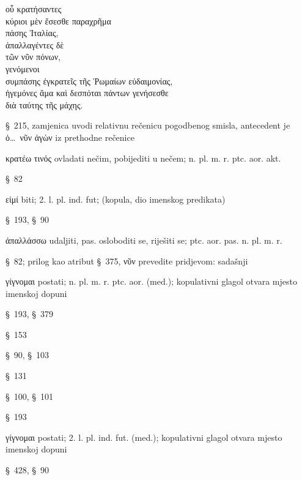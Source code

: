 
{\large
\begin{greek}
\noindent οὗ κρατήσαντες \\
κύριοι μὲν ἔσεσθε παραχρῆμα \\
\tabto{2em} πάσης Ἰταλίας, \\
ἀπαλλαγέντες δὲ \\
\tabto{2em} τῶν νῦν πόνων, \\
γενόμενοι \\
\tabto{2em} συμπάσης ἐγκρατεῖς τῆς Ῥωμαίων εὐδαιμονίας, \\
ἡγεμόνες ἅμα καὶ δεσπόται πάντων γενήσεσθε \\
\tabto{2em} διὰ ταύτης τῆς μάχης.\\

\end{greek}
}

\begin{description}[noitemsep]
\item[οὗ ] §~215, zamjenica uvodi relativnu rečenicu pogodbenog smisla, antecedent je ὁ\dots\ νῦν ἀγὼν iz prethodne rečenice
\item[κρατήσαντες ] κρατέω τινός ovladati nečim, pobijediti u nečem; n. pl. m. r. ptc. aor. akt.
\item[κύριοι ] §~82
\item[ἔσεσθε ] εἰμί biti; 2. l. pl. ind. fut; (kopula, dio imenskog predikata) 
\item[πάσης Ἰταλίας ] §~193, §~90
\item[ἀπαλλαγέντες ] ἀπαλλάσσω udaljiti, pas. osloboditi se, riješiti se; ptc. aor. pas. n. pl. m. r. 
\item[τῶν νῦν πόνων] §~82; prilog kao atribut §~375, νῦν prevedite pridjevom: sadašnji
\item[γενόμενοι ] γίγνομαι postati; n. pl. m. r. ptc. aor. (med.); kopulativni glagol otvara mjesto imenskoj dopuni
\item[συμπάσης] §~193, §~379 
\item[ἐγκρατεῖς ] §~153
\item[τῆς Ῥωμαίων εὐδαιμονίας] §~90, §~103
\item[ἡγεμόνες ] §~131
\item[δεσπόται ] §~100, §~101
\item[πάντων ] §~193
\item[γενήσεσθε ] γίγνομαι postati; 2. l. pl. ind. fut. (med.);  kopulativni glagol otvara mjesto imenskoj dopuni
\item[διὰ ταύτης τῆς μάχης ] §~428, §~90

\end{description}


